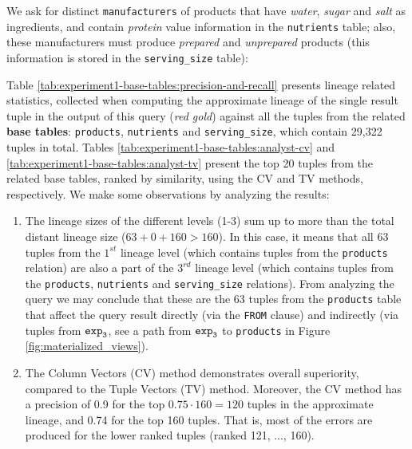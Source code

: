 \begin{experiment-withrun}\label{advanced-experiment:1}
We ask for distinct \texttt{manufacturers} of products that have \textit{water}, \textit{sugar} and \textit{salt} as  ingredients, and contain \textit{protein} value information in the \texttt{nutrients} table; also, these manufacturers must produce \textit{prepared} and \textit{unprepared} products (this information is stored in the \texttt{serving\_size} table):\footnotemark


Table \ref{tab:experiment1-base-tables:precision-and-recall} presents lineage related statistics, collected when computing the approximate lineage of the single result tuple in the output of this query (\textit{red gold}) against all the tuples from the related \textbf{base tables}: \texttt{products}, \texttt{nutrients} and \texttt{serving\_size}, which contain 29,322 tuples in total. Tables \ref{tab:experiment1-base-tables:analyst-cv} and \ref{tab:experiment1-base-tables:analyst-tv} present the top 20 tuples from the related base tables, ranked by similarity, using the CV and TV methods, respectively. We make some observations by analyzing the results:
\begin{enumerate}
    \item The lineage sizes of the different levels (1-3) sum up to more than the total distant lineage size ($63 + 0 + 160 > 160$). In this case, it means that all 63 tuples from the $1^{st}$ lineage level (which contains tuples from the \texttt{products} relation) are also a part of the $3^{rd}$ lineage level (which contains tuples from the \texttt{products}, \texttt{nutrients} and \texttt{serving\_size} relations). From analyzing the query we may conclude that these are the 63 tuples from the \texttt{products} table that affect the query result directly (via the \texttt{FROM} clause) and indirectly (via tuples from $\texttt{exp}\sb\texttt{3}$, see a path from $\texttt{exp}\sb\texttt{3}$ to \texttt{products} in Figure \ref{fig:materialized_views}).
    \item The Column Vectors (CV) method demonstrates overall superiority, compared to the Tuple Vectors (TV) method. Moreover, the  CV method has a precision of 0.9 for the top $0.75\cdot160 = 120$ tuples in the approximate lineage, and 0.74 for the top 160 tuples. That is, most of the errors are produced for the lower ranked tuples (ranked 121, ..., 160).

\end{enumerate}
\end{experiment-withrun}
